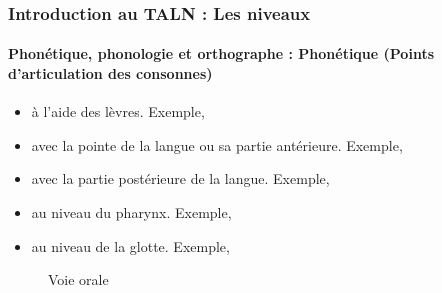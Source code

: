 \documentclass[xcolor=table]{beamer}
\begin{document}
\begin{frame}
\frametitle{Introduction au TALN : Les niveaux}
\framesubtitle{Phonétique, phonologie et orthographe : Phonétique (Points d'articulation des consonnes)}

\begin{minipage}{0.5\textwidth}
\begin{itemize}
	\item {} à l'aide des lèvres. Exemple, \expword{\textipa{[b], [p], [m], [f], [v]}}
	\item {} avec la pointe de la langue ou sa partie antérieure. 
	Exemple, 
	\item {} avec la partie postérieure de la langue. Exemple, 
	\item {} au niveau du pharynx. 
	Exemple, 
	\item {} au niveau de la glotte. 
	Exemple, 
\end{itemize}
\end{minipage}
\begin{minipage}{0.48\textwidth}
	\begin{figure}
		\caption{Voie orale \cite{2009-ball}}
	\end{figure}
\end{minipage}

\end{frame}
\end{document}
